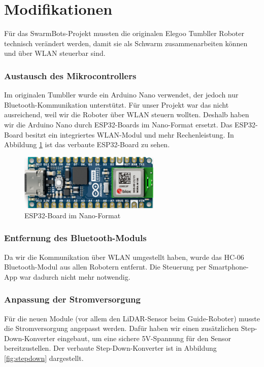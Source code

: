 \section{Modifikationen}
\label{subsec:hardware_modifikationen}

Für das SwarmBots-Projekt mussten die originalen Elegoo Tumbller Roboter technisch verändert werden, damit sie als Schwarm zusammenarbeiten können und über WLAN steuerbar sind.

\subsubsection{Austausch des Mikrocontrollers}
Im originalen Tumbller wurde ein Arduino Nano verwendet, der jedoch nur Bluetooth-Kommunikation unterstützt.
%
Für unser Projekt war das nicht ausreichend, weil wir die Roboter über WLAN steuern wollten.
%
Deshalb haben wir die Arduino Nano durch ESP32-Boards im Nano-Format ersetzt.
%
Das ESP32-Board besitzt ein integriertes WLAN-Modul und mehr Rechenleistung.
%
In Abbildung \ref{fig:nanoesp32} ist das verbaute ESP32-Board zu sehen.
%
\begin{figure}[H]
    \centering
    \includegraphics[width=0.6\textwidth]{img/Hardware/nanoesp32.png}
    \caption{ESP32-Board im Nano-Format}
    \label{fig:nanoesp32}
\end{figure}

\subsubsection{Entfernung des Bluetooth-Moduls}
Da wir die Kommunikation über WLAN umgestellt haben, wurde das HC-06 Bluetooth-Modul aus allen Robotern entfernt.
%
Die Steuerung per Smartphone-App war dadurch nicht mehr notwendig.

\subsubsection{Anpassung der Stromversorgung}
Für die neuen Module (vor allem den LiDAR-Sensor beim Guide-Roboter) musste die Stromversorgung angepasst werden.
%
Dafür haben wir einen zusätzlichen Step-Down-Konverter eingebaut, um eine sichere 5V-Spannung für den Sensor bereitzustellen.
%
Der verbaute Step-Down-Konverter ist in Abbildung \ref{fig:stepdown} dargestellt.

